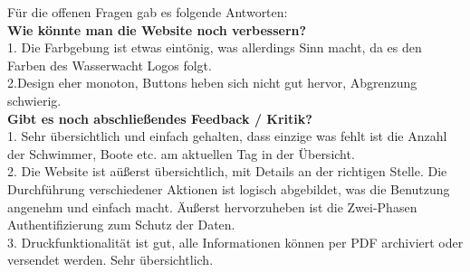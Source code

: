 \documentclass[fontsize=12pt,openright,oneside,paper=a4,BCOR=1cm]{scrbook}
\begin{document}
Für die offenen Fragen gab es folgende Antworten: \\
\textbf{Wie könnte man die Website noch verbessern?} \\
1. Die Farbgebung ist etwas eintönig, was allerdings Sinn macht, da es den Farben des Wasserwacht Logos folgt. \\

2.Design eher monoton, Buttons heben sich nicht gut hervor, Abgrenzung schwierig. \\

\textbf{Gibt es noch abschließendes Feedback / Kritik?} \\
1. Sehr übersichtlich und einfach gehalten, dass einzige was fehlt ist die Anzahl der Schwimmer, Boote etc. am aktuellen Tag in der Übersicht. \\

2. Die Website ist aüßerst übersichtlich, mit Details an der richtigen Stelle. Die Durchführung verschiedener Aktionen ist logisch abgebildet, was die Benutzung angenehm und einfach macht. Äußerst hervorzuheben ist die Zwei-Phasen Authentifizierung zum Schutz der Daten. \\

3. Druckfunktionalität ist gut, alle Informationen können per PDF archiviert oder versendet werden. Sehr übersichtlich. \\
\end{document}
